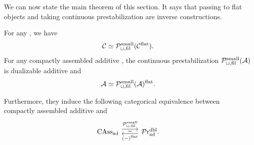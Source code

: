 \documentclass[a4paper,10pt, oneside]{amsart}
\begin{document}
	We can now state the main  theorem of this section. It says that passing to flat objects and taking continuous prestabilization are inverse constructions.
	\begin{thm}\label{main3}
		For any  \dualaddinfcat \mcc, we have $$\mathcal{C}\simeq \mathcal{P}_{\sqcup,\mathrm{fil}}^{\mathrm{small}}(\mathcal{C}^{\mathrm{flat}}) .$$ For any compactly assembled additive \infcat \mca,  the continuous prestabilization $\mathcal{P}_{\sqcup,\mathrm{fil}}^{\mathrm{small}}(\mathcal{A})$ is dualizable additive and $$\mathcal{A}\simeq \mathcal{P}_{\sqcup,\mathrm{fil}}^{\mathrm{small}}(\mathcal{A})^{\mathrm{flat}} .$$
		
		Furthermore, they induce the following categorical equivalence between compactly assembled additive \infcats and \dualaddinfcats   
		$$
		\begin{tikzcd}
			\assad\arrow[r, shift left=1ex, "\mcp_{\sqcup,\op{fil}}^{\op{small}}"{name=G}] & \praddbl\arrow[l, shift left=.5ex, "(-)^{\op{flat}}"{name=F}]
			\arrow[phantom, from=F, to=G, , "\scriptscriptstyle\boldsymbol{\sim}"] .
		\end{tikzcd}$$
	\end{thm}
\end{document}
